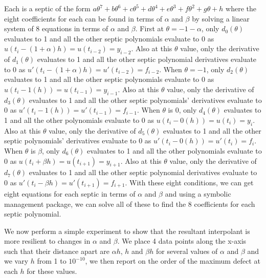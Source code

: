 \documentclass{article}
\begin{document}
Each is a septic of the form $a\theta^7 + b\theta^6 + c\theta^5 + d\theta^4 + e\theta^3 + f\theta^2 + g\theta + h$ where the eight coefficients for each can be found in terms of $\alpha$ and $\beta$ by solving a linear system of 8 equations in terms of $\alpha$ and $\beta$. First at $\theta = -1-\alpha$, only $d_0(\theta)$ evaluates to 1 and all the other septic polynomials evaluate to 0 as $u(t_i - (1+\alpha) h) = u(t_{i - 2}) = y_{i - 2}$. Also at this $\theta$ value, only the derivative of $d_1(\theta)$ evaluates to 1 and all the other septic polynomial derivatives evaluate to 0 as $u'(t_i - (1+\alpha) h) = u'(t_{i - 2}) = f_{i - 2}$. When $\theta = -1$, only $d_2(\theta)$ evaluates to 1 and all the other septic polynomials evaluate to 0 as $u(t_i - 1(h)) = u(t_{i - 1}) = y_{i - 1}$. Also at this $\theta$ value, only the derivative of $d_3(\theta)$ evaluates to 1 and all the other septic polynomials' derivatives evaluate to 0 as $u'(t_i - 1(h)) = u'(t_{i - 1}) = f_{i - 1}$. When $\theta$ is 0, only $d_4(\theta)$ evaluates to 1 and all the other polynomials evaluate to 0 as $u(t_i - 0(h)) = u(t_i) = y_i$. Also at this $\theta$ value, only the derivative of $d_5(\theta)$ evaluates to 1 and all the other septic polynomials' derivatives evaluate to 0 as $u'(t_i - 0(h)) = u'(t_i) = f_i$. When $\theta$ is $\beta$, only $d_6(\theta)$ evaluates to 1 and all the other polynomials evaluate to 0 as $u(t_i + \beta h) = u(t_{i+1}) = y_{i+1}$. Also at this $\theta$ value, only the derivative of $d_7(\theta)$ evaluates to 1 and all the other septic polynomial derivatives evaluate to 0 as $u'(t_i - \beta h) = u'(t_{i+1}) = f_{i+1}$. With these eight conditions, we can get eight equations for each septic in terms of $\alpha$ and $\beta$ and using a symbolic management package, we can solve all of these to find the 8 coefficients for each septic polynomial.

We now perform a simple experiment to show that the resultant interpolant is more resilient to changes in $\alpha$ and $\beta$. We place 4 data points along the x-axis such that their distance apart are $\alpha h$, $h$ and $\beta h$ for several values of $\alpha$ and $\beta$ and we vary $h$ from 1 to $10^{-10}$, we then report on the order of the maximum defect at each $h$ for these values.
\end{document}
